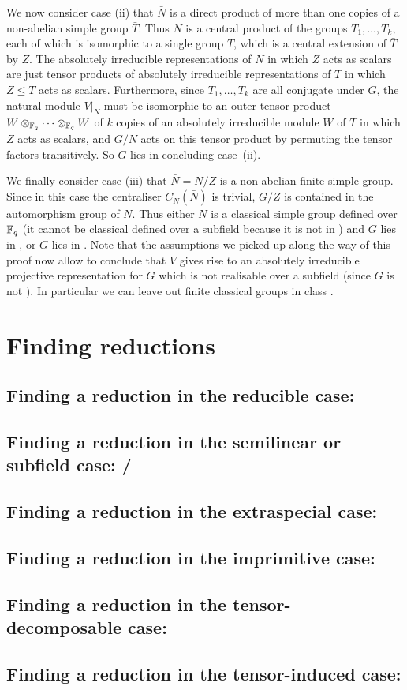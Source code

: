 We now consider case (ii) that $\bar N$ is a direct product of more than
one copies of a non-abelian simple group $\bar T$. Thus $N$ is a
central product of the groups $T_1, \ldots, T_k$, each of which is
isomorphic to a single group $T$, which is a central extension of
$\bar T$ by $Z$. The absolutely irreducible representations
of $N$ in which $Z$ acts as scalars are just tensor products of 
absolutely irreducible representations of $T$ in which $Z \le T$ acts as
scalars. Furthermore, since $T_1, \ldots, T_k$ are all conjugate under
$G$, the natural module $V|_N$ must be isomorphic to an outer tensor product
$W \otimes_{\mathbb{F}_q} \cdots \otimes_{\mathbb{F}_q} W$ 
of $k$ copies of an absolutely irreducible module $W$ of $T$ in which $Z$
acts as scalars, and $G/N$ acts on this tensor product by permuting
the tensor factors transitively. So $G$ lies in  
concluding case~(ii).

We finally consider case (iii) that $\bar N = N/Z$ is a non-abelian finite 
simple group. Since in this case the centraliser $C_{\bar N}(\bar N)$ is 
trivial, $G/Z$ is contained in the automorphism group of $\bar N$. 
Thus either $N$ is a classical simple group defined over $\mathbb{F}_q$ (it
cannot be classical defined over a subfield because it is not in ) and
$G$ lies in , or $G$ lies in . Note that the assumptions we
picked up along the way of this proof now allow to conclude that $V$
gives rise to an absolutely irreducible projective representation for
$G$ which is not realisable over a subfield (since $G$ is not ). In
particular we can leave out finite classical groups in class .
\proofend

\section{Finding reductions}
\label{findred}

\subsection{Finding a reduction in the reducible case: }
\label{solveC1}

\subsection{Finding a reduction in the semilinear or subfield case: /}
\label{solveC3C5}

\subsection{Finding a reduction in the extraspecial case: }
\label{solveC6}

\subsection{Finding a reduction in the imprimitive case: }
\label{solveC2}

\subsection{Finding a reduction in the tensor-decomposable case: }
\label{solveC4}

\subsection{Finding a reduction in the tensor-induced case: }
\label{solveC7}



